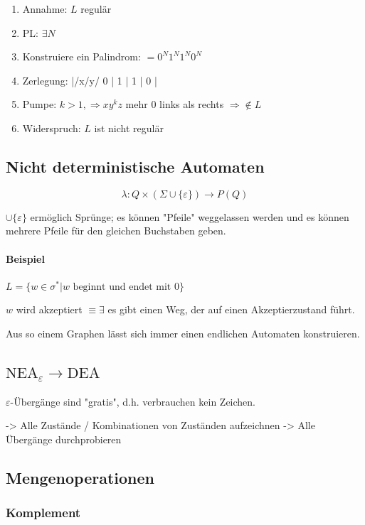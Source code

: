 \begin{enumerate}
	\item	Annahme: $L$ regulär
	\item	PL: $\exists N$
	\item	Konstruiere ein Palindrom: $=0^N1^N1^N0^N$
	\item	Zerlegung: |/x/y/ 0 | 1  |  1 | 0 |
	\item	Pumpe: $k > 1, \Rightarrow xy^kz$ mehr $0$ links als rechts $\Rightarrow \not\in L$ \Lightning
	\item	Widerspruch: $L$ ist nicht regulär
\end{enumerate}

\subsection{Nicht deterministische Automaten}

\[
 \lambda : Q \times (\Sigma \cup \{\varepsilon\}) \rightarrow P(Q)
\]

$\cup \{\varepsilon\}$ ermöglich Sprünge; es können "Pfeile" weggelassen werden und es können mehrere Pfeile für den gleichen Buchstaben geben.

\paragraph{Beispiel} $L=\{ w \in \sigma^\ast | w \text{ beginnt und endet mit } 0\}$


$w$ wird akzeptiert $\equiv \exists$  es gibt einen Weg, der auf einen Akzeptierzustand führt.

Aus so einem Graphen lässt sich immer einen endlichen Automaten konstruieren.


\subsection{$\text{NEA}_\varepsilon \to \text{DEA}$}

$\varepsilon$-Übergänge sind "gratis", d.h. verbrauchen kein Zeichen.


-> Alle Zustände / Kombinationen von Zuständen aufzeichnen
-> Alle Übergänge durchprobieren


\subsection{Mengenoperationen}
\subsubsection{Komplement}

